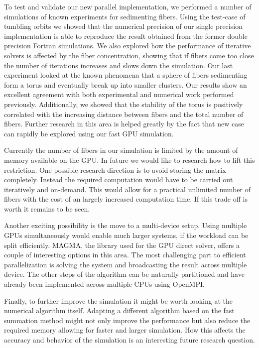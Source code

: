 To test and validate our new parallel implementation, we performed a number of simulations of known experiments for sedimenting fibers. Using the test-case of tumbling orbits we showed that the numerical precision of our single precision implementation is able to reproduce the result obtained from the former double precision Fortran simulations. We also explored how the performance of iterative solvers is affected by the fiber concentration, showing that if fibers come too close the number of iterations increases and slows down the simulation. Our last experiment looked at the known phenomena that a sphere of fibers sedimenting form a torus and eventually break up into smaller clusters. Our results show an excellent agreement with both experimental and numerical work performed previously. Additionally, we showed that the stability of the torus is positively correlated with the increasing distance between fibers and the total number of fibers. Further research in this area is helped greatly by the fact that new case can rapidly be explored using our fast GPU simulation.

Currently the number of fibers in our simulation is limited by the amount of memory available on the GPU. In future we would like to research how to lift this restriction. One possible research direction is to avoid storing the matrix completely. Instead the required computation would have to be carried out iteratively and on-demand. This would allow for a practical unlimited number of fibers with the cost of an largely increased computation time. If this trade off is worth it remains to be seen.

Another exciting possibility is the move to a multi-device setup. Using multiple GPUs simultaneously would enable much larger systems, if the workload can be split efficiently. MAGMA, the library used for the GPU direct solver, offers a couple of interesting options in this area. The most challenging part to efficient parallelization is solving the system and broadcasting the result across multiple device. The other steps of the algorithm can be naturally partitioned and have already been implemented across multiple CPUs using OpenMPI.

Finally, to further improve the simulation it might be worth looking at the numerical algorithm itself. Adapting a different algorithm based on the fast summation method might not only improve the performance but also reduce the required memory allowing for faster and larger simulation. How this affects the accuracy and behavior of the simulation is an interesting future research question.
